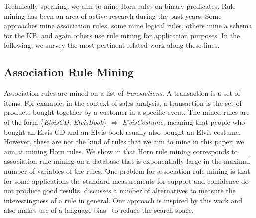 Technically speaking, we aim to mine Horn rules on binary predicates.
Rule mining has been an area of active research during the past years.
Some approaches mine association rules, some mine logical rules, others mine a schema for the KB, and again others use rule mining for application purposes.
In the following, we survey the most pertinent related work along these lines.
\subsection{Association Rule Mining}
Association rules \cite{AgrImiSwa93} are mined on a list of \emph{transactions}. A transaction is a set of items.
For example, in the context of sales analysis, a transaction is the set of products bought together by a customer in a specific event.
The mined rules are of the form \{\emph{ElvisCD, ElvisBook}\} $\Rightarrow$ \emph{ElvisCostume}, meaning that people who bought an Elvis CD and an Elvis book usually also bought an Elvis costume.
However, these are not the kind of rules that we aim to mine in this paper; we aim at mining Horn rules. We show in \cite{amie} that Horn rule mining corresponds to association rule mining on a database that is exponentially large in the maximal number of variables of the rules.
One problem for association rule mining is that for some applications the standard measurements for support and confidence do not produce good results.
\cite{TanKumSri02} discusses a number of alternatives to measure the interestingness of a rule in general.
Our approach is inspired by this work and also makes use of a language bias~\cite{AdeRaeBru95} to reduce the search space. %


